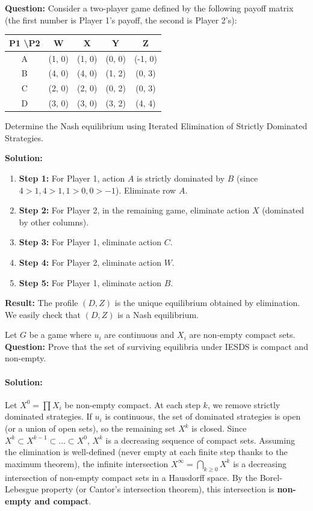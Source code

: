 \begin{exemple}
\textbf{Question:}
Consider a two-player game defined by the following payoff matrix (the first number is Player 1's payoff, the second is Player 2's):

\begin{center}
\begin{tabular}{c|cccc}
P1 \textbackslash P2 & W & X & Y & Z \\ \hline
A & (1, 0) & (1, 0) & (0, 0) & (-1, 0) \\
B & (4, 0) & (4, 0) & (1, 2) & (0, 3) \\
C & (2, 0) & (2, 0) & (0, 2) & (0, 3) \\
D & (3, 0) & (3, 0) & (3, 2) & (4, 4)
\end{tabular}
\end{center}

Determine the Nash equilibrium using Iterated Elimination of Strictly Dominated Strategies.

\textbf{Solution:}
\begin{enumerate}
    \item \textbf{Step 1:} For Player 1, action $A$ is strictly dominated by $B$ (since $4 > 1, 4 > 1, 1 > 0, 0 > -1$). Eliminate row $A$.
    \item \textbf{Step 2:} For Player 2, in the remaining game, eliminate action $X$ (dominated by other columns).
    \item \textbf{Step 3:} For Player 1, eliminate action $C$.
    \item \textbf{Step 4:} For Player 2, eliminate action $W$.
    \item \textbf{Step 5:} For Player 1, eliminate action $B$.
\end{enumerate}
\textbf{Result:} The profile $(D, Z)$ is the unique equilibrium obtained by elimination. We easily check that $(D, Z)$ is a Nash equilibrium.

\end{exemple}

\begin{exemple}
Let $G$ be a game where $u_i$ are continuous and $X_i$ are non-empty compact sets.
\textbf{Question:} Prove that the set of surviving equilibria under IESDS is compact and non-empty.

\paragraph{Solution:}
Let $X^0 = \prod X_i$ be non-empty compact.
At each step $k$, we remove strictly dominated strategies. If $u_i$ is continuous, the set of dominated strategies is open (or a union of open sets), so the remaining set $X^k$ is closed.
Since $X^k \subset X^{k-1} \subset \dots \subset X^0$, $X^k$ is a decreasing sequence of compact sets.
Assuming the elimination is well-defined (never empty at each finite step thanks to the maximum theorem), the infinite intersection $X^\infty = \bigcap_{k \ge 0} X^k$ is a decreasing intersection of non-empty compact sets in a Hausdorff space.
By the Borel-Lebesgue property (or Cantor's intersection theorem), this intersection is \textbf{non-empty and compact}.
\end{exemple}

